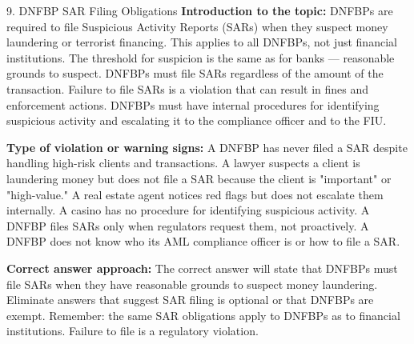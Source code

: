 \documentclass[11pt,a4paper]{beamer}
\begin{document}
\begin{frame}{9. DNFBP SAR Filing Obligations}
\tiny
\noindent\textbf{Introduction to the topic:} DNFBPs are required to file Suspicious Activity Reports (SARs) when they suspect money laundering or terrorist financing. This applies to all DNFBPs, not just financial institutions. The threshold for suspicion is the same as for banks — reasonable grounds to suspect. DNFBPs must file SARs regardless of the amount of the transaction. Failure to file SARs is a violation that can result in fines and enforcement actions. DNFBPs must have internal procedures for identifying suspicious activity and escalating it to the compliance officer and to the FIU.

\vspace{0.1cm}
\noindent\textbf{Type of violation or warning signs:} A DNFBP has never filed a SAR despite handling high-risk clients and transactions. A lawyer suspects a client is laundering money but does not file a SAR because the client is "important" or "high-value." A real estate agent notices red flags but does not escalate them internally. A casino has no procedure for identifying suspicious activity. A DNFBP files SARs only when regulators request them, not proactively. A DNFBP does not know who its AML compliance officer is or how to file a SAR.

\vspace{0.1cm}
\noindent\textbf{Correct answer approach:} The correct answer will state that DNFBPs must file SARs when they have reasonable grounds to suspect money laundering. Eliminate answers that suggest SAR filing is optional or that DNFBPs are exempt. Remember: the same SAR obligations apply to DNFBPs as to financial institutions. Failure to file is a regulatory violation.
\end{frame}
\end{document}
